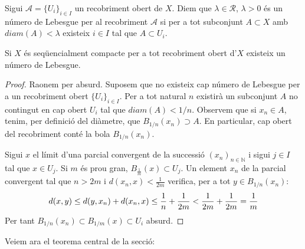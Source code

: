 \documentclass[../main.tex]{subfiles}
\begin{document}
\begin{defi}
\label{def:nombredelebesgue} Sigui $\mathcal{A} = \{U_i\}_{i\in I}$ un recobriment obert de $X$. Diem que $\lambda\in\mathcal{R}$, $\lambda>0$ és un número de Lebesgue per al recobriment $\mathcal{A}$ si per a tot subconjunt $A\subset X$ amb $diam(A)<\lambda$ existeix $i\in I$ tal que $A\subset U_i$.
\end{defi}

\begin{prop}
\label{prop:existeixnumerolebesgue} Si $X$ és seqüencialment compacte per a tot recobriment obert d'$X$ existeix un número de Lebesgue.
\end{prop}
\begin{proof}
 Raonem per absurd. Suposem que no existeix cap número de Lebesgue per a un recobriment obert $\{U_i\}_{i\in I}$. Per a tot natural $n$ existirà un subconjunt $A$ no contingut en cap obert $U_i$ tal que $diam(A)<1/n$. Observem que si $x_n\in A$, tenim, per definició del diàmetre, que $B_{1/n}(x_n)\supset A$. En particular, cap obert del recobriment conté la bola $B_{1/n}(x_n)$.
 
 Sigui $x$ el límit d'una parcial convergent de la successió $(x_n)_{n\in\mathbb{N}}$ i sigui $j\in I$ tal que $x\in U_j$. Si $m$ és prou gran, $B_\frac{1}{m}(x)\subset U_j$. Un element $x_n$ de la parcial convergent tal que $n>2m$ i $d(x_n,x)<\frac{1}{2m}$ verifica, per a tot $y\in B_{1/n}(x_n)$:
 \begin{equation}
     \notag
     d(x,y)\leq d(y,x_n)+d(x_n,x)\leq \frac{1}{n}+\frac{1}{2m}< \frac{1}{2m}+\frac{1}{2m}= \frac{1}{m}
 \end{equation}
 Per tant $B_{1/n}(x_n)\subset B_{1/m}(x)\subset U_i$ absurd.
\end{proof}

Veiem ara el teorema central de la secció:
\end{document}
